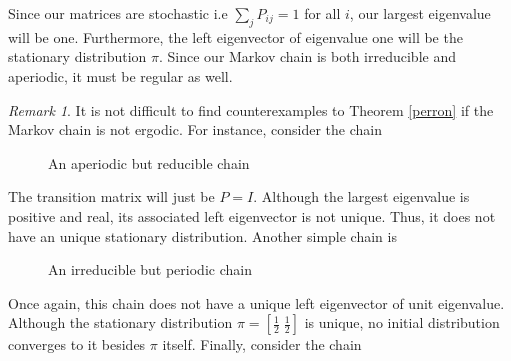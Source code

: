 \documentclass[12pt]{amsart}
\theoremstyle{definition}
\theoremstyle{remark}
\newtheorem{remark}[theorem]{Remark}
\numberwithin{equation}{section}
\theoremstyle{remark}
\begin{document}
\noindent Since our matrices are stochastic i.e $\sum_{j} P_{ij} = 1$ for all $i$, our largest eigenvalue will be one. Furthermore, the left eigenvector of eigenvalue one will be the stationary distribution $\pi$. Since our Markov chain is both irreducible and aperiodic, it must be regular as well.
%
\begin{remark}
  It is not difficult to find counterexamples to Theorem \ref{perron} if the Markov chain is not ergodic. For instance, consider the chain

  \begin{figure}[h!]
    \centering
    \caption{An aperiodic but reducible chain}
  \end{figure}
  The transition matrix will just be $P = I$. Although the largest eigenvalue is positive and real, its associated left eigenvector is not unique. Thus, it does not have an unique stationary distribution. Another simple chain is

  \begin{figure}[h!]
    \centering
    \caption{An irreducible but periodic chain}
  \end{figure}

  Once again, this chain does not have a unique left eigenvector of unit eigenvalue. Although the stationary distribution $\pi = [\frac{1}{2} \; \frac{1}{2}]$ is unique, no initial distribution converges to it besides $\pi$ itself. Finally, consider the chain

  \begin{figure}[h!]
    \centering
\end{figure}
\end{remark}
\end{document}
